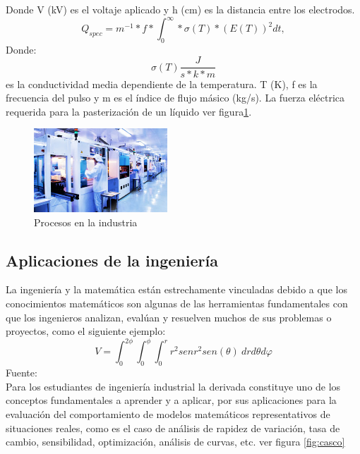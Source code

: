 \documentclass[12pt,a4paper]{article}
\begin{document}
Donde V (kV) es el voltaje aplicado y h (cm) es la distancia entre los electrodos. 
\begin{equation}
Q_{spec} = m^{-1} * f* \int_{0}^{\infty} * \sigma (T)* (E(T))^2 dt,
\end{equation}
Donde:  \begin{equation}
\sigma (T) \frac{J}{s*k*m}
\end{equation} 
es la conductividad media dependiente de la temperatura.
 T (K), f es la frecuencia del pulso y m es el índice de flujo másico (kg/s). La fuerza eléctrica requerida para la pasterización de un líquido ver figura\ref{fig:ing}.\\
 
\begin{figure}[h!]
\centering
\includegraphics[width=5cm]{ing}
\caption{Procesos en la industria}
\label{fig:ing}
\end{figure}
\newpage
\subsection{Aplicaciones  de la ingeniería}
La ingeniería y la matemática están estrechamente vinculadas debido a que los conocimientos matemáticos son algunas de las herramientas fundamentales con que los ingenieros analizan, evalúan y resuelven muchos de sus problemas o proyectos, como el siguiente ejemplo: \\

\begin{equation}
V = \int_{0}^{2\phi} \int_{0}^{\phi} \int_{0}^{r} r^2 sen r^2sen(\theta)\ dr d \theta d\varphi
\end{equation}
Fuente:\cite{Sacancela2000}\\

Para los estudiantes de ingeniería industrial la derivada constituye uno de los conceptos fundamentales a aprender y a aplicar, por sus aplicaciones para la evaluación del comportamiento de modelos matemáticos representativos de situaciones reales, como es el caso de análisis de rapidez de variación, tasa de cambio, sensibilidad, optimización, análisis de curvas, etc. ver figura \ref{fig:casco} \\
\end{document}
